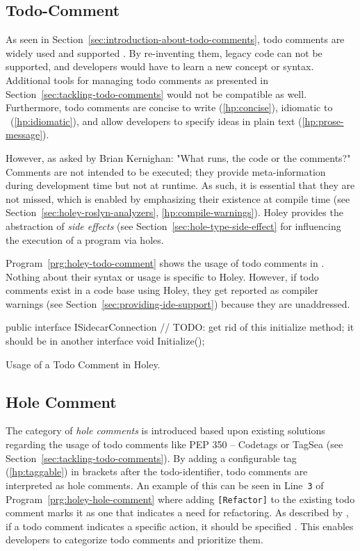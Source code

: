 \subsection{Todo-Comment}
As seen in Section~\ref{sec:introduction-about-todo-comments}, todo comments are widely used and supported \cite{jetbrains_todo_2023}.
By re-inventing them, legacy code can not be supported, and developers would have to learn a new concept or syntax.
Additional tools for managing todo comments as presented in Section~\ref{sec:tackling-todo-comments} would not be compatible as well.
Furthermore, todo comments are concise to write (\ref{hp:concise}), idiomatic to \CS\ (\ref{hp:idiomatic}), and allow developers to specify ideas in plain text (\ref{hp:prose-message}).

However, as asked by Brian Kernighan: "What runs, the code or the comments?"
Comments are not intended to be executed; they provide meta-information during development time but not at runtime.
As such, it is essential that they are not missed, which is enabled by emphasizing their existence at compile time (see Section~\ref{sec:holey-roslyn-analyzers}, \ref{hp:compile-warnings}).
Holey provides the abstraction of \emph{side effects} (see Section~\ref{sec:hole-type-side-effect} for influencing the execution of a program via holes.

Program~\ref{prg:holey-todo-comment} shows the usage of todo comments in \CS.
Nothing about their syntax or usage is specific to Holey.
However, if todo comments exist in a code base using Holey, they get reported as compiler warnings (see Section~\ref{sec:providing-ide-support}) because they are unaddressed.

\begin{program}[ht]
\begin{CsCode}
public interface ISidecarConnection
{
	// TODO: get rid of this initialize method; it should be in another interface
	void Initialize();
}
\end{CsCode}
\caption{Usage of a Todo Comment in Holey.}
\label{prg:holey-todo-comment}
\end{program}

\subsection{Hole Comment}
The category of \emph{hole comments} is introduced based upon existing solutions regarding the usage of todo comments like PEP 350 -- Codetags or TagSea (see Section~\ref{sec:tackling-todo-comments}).
By adding a configurable tag (\ref{hp:taggable}) in brackets after the todo-identifier, todo comments are interpreted as hole comments.
An example of this can be seen in Line~\verb|3| of Program~\ref{prg:holey-hole-comment} where adding \verb|[Refactor]| to the existing todo comment marks it as one that indicates a need for refactoring.
As described by \citeauthor{goldin_stop_2022}, if a todo comment indicates a specific action, it should be specified \cite{goldin_stop_2022}.
This enables developers to categorize todo comments and prioritize them.


